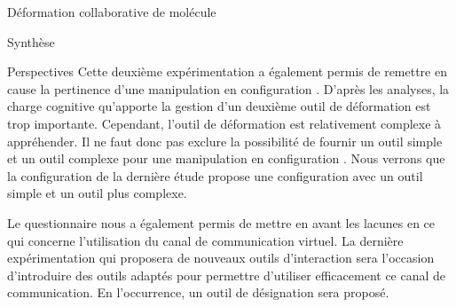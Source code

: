 \documentclass[myfrancais]{mythesis}
\begin{document}
\begin{mychapter}{Déformation collaborative de molécule}
\begin{mysection}{Synthèse}
\begin{mysubsection}{Perspectives}
				Cette deuxième expérimentation a également permis de remettre en cause la pertinence d'une manipulation en configuration .
				D'après les analyses, la charge cognitive qu'apporte la gestion d'un deuxième outil de déformation est trop importante.
				Cependant, l'outil de déformation est relativement complexe à appréhender.
				Il ne faut donc pas exclure la possibilité de fournir un outil simple et un outil complexe pour une manipulation en configuration .
				Nous verrons que la configuration de la dernière étude  propose une configuration  avec un outil simple et un outil plus complexe.

				Le questionnaire nous a également permis de mettre en avant les lacunes en ce qui concerne l'utilisation du canal de communication virtuel.
				La dernière expérimentation qui proposera de nouveaux outils d'interaction sera l'occasion d'introduire des outils adaptés pour permettre d'utiliser efficacement ce canal de communication.
				En l'occurrence, un outil de désignation sera proposé.
			\end{mysubsection}
		\end{mysection}
	\end{mychapter}
\end{document}
